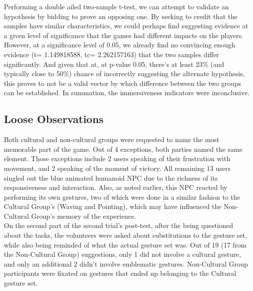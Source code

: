     Performing a double ailed two-sample t-test, we can attempt to validate an hypothesis by bidding to prove an opposing one. By seeking to credit that the samples have similar characteristics, we could perhaps find suggesting evidence at a given level of significance that the games had different impacts on the players. However, at a significance level of 0.05, we already find no convincing enough evidence (t= 1.149818588, tc= 2.262157163) that the two samples differ significantly. And given that at, at p-value 0.05, there's at least 23\% (and typically close to 50\%) chance of incorrectly suggesting the alternate hypothesis, this proves to not be a valid vector by which difference between the two groups can be established. In summation, the immersiveness indicators were inconclusive.\\
    
\subsection{Loose Observations} \label{sec:results_surveys_disjointed}
    Both cultural and non-cultural groups were requested to name the most memorable part of the game. Out of 4 exceptions, both parties named the same element. Those exceptions include 2 users speaking of their frustration with movement, and 2 speaking of the moment of victory. All remaining 13 users singled out the blue animated humanoid NPC due to the richness of its responsiveness and interaction. Also, as noted earlier, this NPC reacted by performing its own gestures, two of which were done in a similar fashion to the Cultural Group's (Waving and Pointing), which may have influenced the Non-Cultural Group's memory of the experience.\\
    On the second part of the second trial's post-test, after the being questioned about the tasks, the volunteers were asked about substitutions to the gesture set, while also being reminded of what the actual gesture set was. Out of 19 (17 from the Non-Cultural Group) suggestions, only 1 did not involve a cultural gesture, and only an additional 2 didn't involve emblematic gestures. Non-Cultural Group participants were fixated on gestures that ended up belonging to the Cultural gesture set.\\